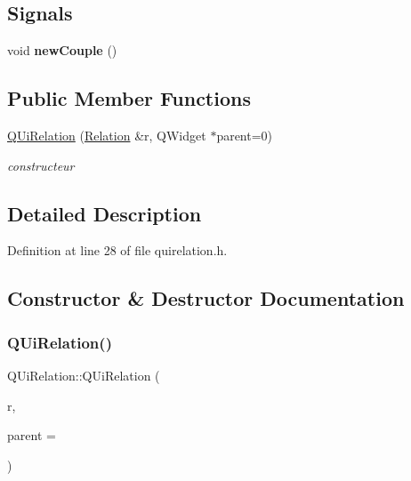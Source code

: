 \subsection*{Signals}
\begin{DoxyCompactItemize}
\item 
\mbox{\label{class_q_ui_relation_a631d95a38337e49c7d83a201d6fbe5a7}} 
void {\bfseries new\+Couple} ()
\end{DoxyCompactItemize}
\subsection*{Public Member Functions}
\begin{DoxyCompactItemize}
\item 
\hyperlink{class_q_ui_relation_a4d31962371f2008d814958cdf3810e14}{Q\+Ui\+Relation} (\hyperlink{class_relation}{Relation} \&r, Q\+Widget $\ast$parent=0)
\begin{DoxyCompactList}\small\item\em constructeur \end{DoxyCompactList}\end{DoxyCompactItemize}


\subsection{Detailed Description}


Definition at line 28 of file quirelation.\+h.



\subsection{Constructor \& Destructor Documentation}
\mbox{\label{class_q_ui_relation_a4d31962371f2008d814958cdf3810e14}} 
\subsubsection{\texorpdfstring{Q\+Ui\+Relation()}{QUiRelation()}}
{\footnotesize\ttfamily Q\+Ui\+Relation\+::\+Q\+Ui\+Relation (\begin{DoxyParamCaption}\item[{\hyperlink{class_relation}{Relation} \&}]{r,  }\item[{Q\+Widget $\ast$}]{parent = {} }\end{DoxyParamCaption})\hspace{0.3cm}{\ttfamily [explicit]}}



